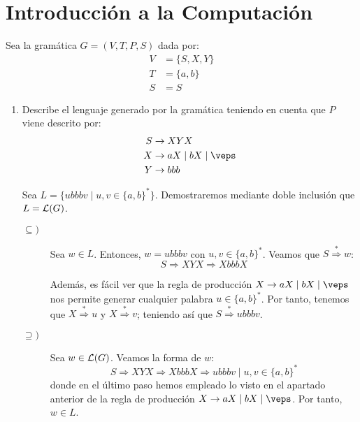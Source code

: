 \section{Introducción a la Computación}


\begin{ejercicio}
    Sea la gramática $G=\left(V,T,P,S\right)$ dada por:
    \begin{align*}
        V &= \{S, X, Y\} \\
        T &= \{a,b\} \\
        S &= S
    \end{align*}
    \begin{enumerate}
        \item Describe el lenguaje generado por la gramática teniendo en cuenta que $P$ viene descrito por:
        \begin{align*}
            S &\rightarrow XYX \\
            X &\rightarrow aX \mid bX \mid \veps \\
            Y &\rightarrow bbb
        \end{align*}

        Sea $L=\{ubbbv\mid u,v\in\{a,b\}^\ast\}$. Demostraremos mediante doble inclusión que $L=\mathcal{L}(G)$.
        \begin{description}
            \item[$\subseteq)$] Sea $w\in L$. Entonces, $w=ubbbv$ con $u,v\in\{a,b\}^\ast$. Veamos que
            $S \stackrel{\ast}{\Longrightarrow} w$:
            \begin{equation*}
                S \Longrightarrow XYX \Longrightarrow XbbbX
            \end{equation*}

            Además, es fácil ver que la regla de producción $X\rightarrow aX \mid bX \mid \veps$ nos permite generar cualquier palabra $u\in\{a,b\}^\ast$. Por tanto, tenemos que $X \stackrel{\ast}{\Longrightarrow} u$ y $X \stackrel{\ast}{\Longrightarrow} v$; teniendo así que $S \stackrel{\ast}{\Longrightarrow} ubbbv$.

            \item[$\supseteq)$] Sea $w\in\mathcal{L}(G)$. Veamos la forma de $w$:
            \begin{equation*}
                S \Longrightarrow XYX \Longrightarrow XbbbX \Longrightarrow ubbbv \mid u,v\in\{a,b\}^\ast
            \end{equation*}
            donde en el último paso hemos empleado lo visto en el apartado anterior de la regla de producción $X\rightarrow aX \mid bX \mid \veps$. Por tanto, $w\in L$.
        \end{description}



\end{enumerate}
\end{ejercicio}
